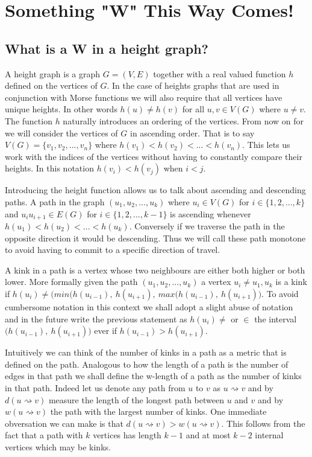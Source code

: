 \chapter{Something "W" This Way Comes!}
\label{chapter1}

\section{What is a W in a height graph?}

A height graph is a graph $G = (V, E)$ together with a real valued function $h$ defined on the vertices of $G$. In the case of heights graphs that are used in conjunction with Morse functions we will also require that all vertices have unique heights. In other words $h(u) \ne h(v)$ for all $u ,v \in V(G)$ where $u \ne v$. The function $h$ naturally introduces an ordering of the vertices. From now on for we will consider the vertices of $G$ in ascending order. That is to say $V(G) = \{v_1, v_2, ... , v_n\}$ where $h(v_1) < h(v_2) < ... < h(v_n)$. This lets us work with the indices of the vertices without having to constantly compare their heights. In this notation $h(v_i) < h(v_j)$ when $i < j$.

Introducing the height function allows us to talk about ascending and descending paths. A path in the graph $(u_1, u_2, ... , u_k)$ where $u_i \in V(G)$ for $i \in \{1, 2, ..., k\}$ and $u_iu_{i+1} \in E(G)$ for $i \in \{1, 2, ..., k-1\}$ is ascending whenever $h(u_1) < h(u_2) < ... < h(u_k)$. Conversely if we traverse the path in the opposite direction it would be descending. Thus we will call these path monotone to avoid having to commit to a specific direction of travel.

A kink in a path is a vertex whose two neighbours are either both higher or both lower. More formally given the path $(u_1, u_2, ... , u_k)$ a vertex $u_i \ne u_1, u_k$ is a kink if $h(u_i) \ne \big( min(h(u_{i-1}),~h(u_{i+1}),~max(h(u_{i-1}),~h(u_{i+1}) \big)$. To avoid cumbersome notation in this context we shall adopt a slight abuse of notation and in the future write the previous statement as $h(u_i) \ne $ or $ \in $ the interval $\big(h(u_{i-1}),~h(u_{i+1}) \big)$ ever if $h(u_{i-1}) > h(u_{i+1})$.

Intuitively we can think of the number of kinks in a path as a metric that is defined on the path. Analogous to how the length of a path is the number of edges in that path we shall define the w-length of a path as the number of kinks in that path. Indeed let us denote any path from $u$ to $v$ as $u \rightsquigarrow v$ and by $d(u \rightsquigarrow v)$ measure the length of the longest path between $u$ and $v$ and by $w(u \rightsquigarrow v)$ the path with the largest number of kinks. One immediate obversation we can make is that $d(u \rightsquigarrow v) > w(u \rightsquigarrow v)$. This follows from the fact that a path with $k$ vertices has length $k-1$ and at most $k-2$ internal vertices which may be kinks.


